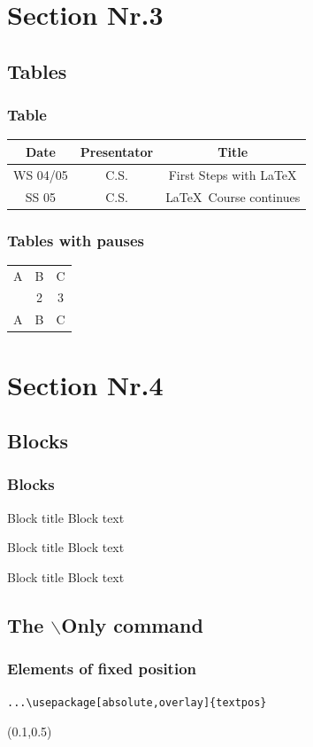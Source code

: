\documentclass{beamer}	%
\begin{document}
\section{Section Nr.3} 
\subsection{Tables}
\begin{frame}
\frametitle{Table}
\begin{tabular}{|c|c|c|}
\hline
\textbf{Date} & \textbf{Presentator} & \textbf{Title} \\
\hline
WS 04/05 & C.S. &  First Steps with \LaTeX  \\
\hline
SS 05 & C.S. & \LaTeX \ Course continues \\
\hline
\end{tabular}
\end{frame}


\begin{frame}
\frametitle{Tables with pauses}
\begin{tabular}{c c c}
A & B & C \\ 
\pause 
1 & 2 & 3 \\  
\pause 
A & B & C \\ 
\end{tabular} 
\end{frame}


\section{Section Nr.4}
\subsection{Blocks}
\begin{frame}\frametitle{Blocks}

\begin{block}{Block title}
Block text
\end{block}

\begin{exampleblock}{Block title}
Block text 
\end{exampleblock}


\begin{alertblock}{Block title}
Block text 
\end{alertblock}
\end{frame}


\subsection{The $\backslash$Only command}
\begin{frame}[fragile]\frametitle{Elements of fixed position}
\begin{verbatim}...\usepackage[absolute,overlay]{textpos} \end{verbatim}
\vspace*{3cm}
\begin{textblock}{0.6}(0.1,0.5)
\end{textblock}
\end{frame}
\end{document}
